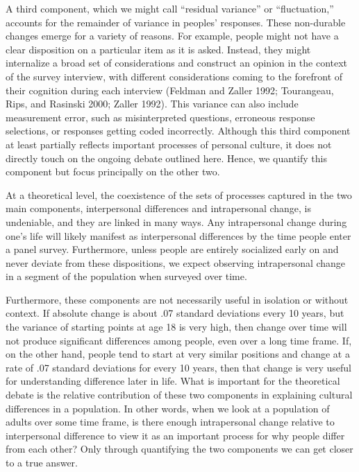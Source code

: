 \documentclass[
  11pt,
]{article}
\begin{document}
A third component, which we might call ``residual variance'' or
``fluctuation,'' accounts for the remainder of variance in peoples'
responses. These non-durable changes emerge for a variety of reasons.
For example, people might not have a clear disposition on a particular
item as it is asked. Instead, they might internalize a broad set of
considerations and construct an opinion in the context of the survey
interview, with different considerations coming to the forefront of
their cognition during each interview (Feldman and Zaller 1992;
Tourangeau, Rips, and Rasinski 2000; Zaller 1992). This variance can
also include measurement error, such as misinterpreted questions,
erroneous response selections, or responses getting coded incorrectly.
Although this third component at least partially reflects important
processes of personal culture, it does not directly touch on the ongoing
debate outlined here. Hence, we quantify this component but focus
principally on the other two.

At a theoretical level, the coexistence of the sets of processes
captured in the two main components, interpersonal differences and
intrapersonal change, is undeniable, and they are linked in many ways.
Any intrapersonal change during one's life will likely manifest as
interpersonal differences by the time people enter a panel survey.
Furthermore, unless people are entirely socialized early on and never
deviate from these dispositions, we expect observing intrapersonal
change in a segment of the population when surveyed over time.

Furthermore, these components are not necessarily useful in isolation or
without context. If absolute change is about .07 standard deviations
every 10 years, but the variance of starting points at age 18 is very
high, then change over time will not produce significant differences
among people, even over a long time frame. If, on the other hand, people
tend to start at very similar positions and change at a rate of .07
standard deviations for every 10 years, then that change is very useful
for understanding difference later in life. What is important for the
theoretical debate is the relative contribution of these two components
in explaining cultural differences in a population. In other words, when
we look at a population of adults over some time frame, is there enough
intrapersonal change relative to interpersonal difference to view it as
an important process for why people differ from each other? Only through
quantifying the two components we can get closer to a true answer.
\end{document}
